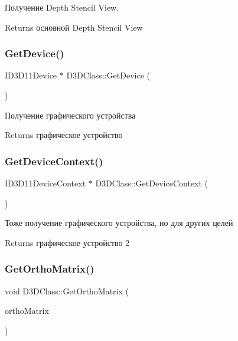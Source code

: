 Получение Depth Stencil View. 

\begin{DoxyReturn}{Returns}
основной Depth Stencil View 
\end{DoxyReturn}
\mbox{\label{class_d3_d_class_a20963c561731ea05018ec626d1fba80c}} 
\subsubsection{\texorpdfstring{Get\+Device()}{GetDevice()}}
{\footnotesize\ttfamily I\+D3\+D11\+Device $\ast$ D3\+D\+Class\+::\+Get\+Device (\begin{DoxyParamCaption}{ }\end{DoxyParamCaption})}



Получение графического устройства 

\begin{DoxyReturn}{Returns}
графическое устройство 
\end{DoxyReturn}
\mbox{\label{class_d3_d_class_a1d0ac6cc358094b68afa7637c95ec47e}} 
\subsubsection{\texorpdfstring{Get\+Device\+Context()}{GetDeviceContext()}}
{\footnotesize\ttfamily I\+D3\+D11\+Device\+Context $\ast$ D3\+D\+Class\+::\+Get\+Device\+Context (\begin{DoxyParamCaption}{ }\end{DoxyParamCaption})}



Тоже получение графического устройства, но для других целей 

\begin{DoxyReturn}{Returns}
графическое устройство 2 
\end{DoxyReturn}
\mbox{\label{class_d3_d_class_a7227e509b814c581f9e9360c408f64d3}} 
\subsubsection{\texorpdfstring{Get\+Ortho\+Matrix()}{GetOrthoMatrix()}}
{\footnotesize\ttfamily void D3\+D\+Class\+::\+Get\+Ortho\+Matrix (\begin{DoxyParamCaption}\item[{D3\+D\+X\+M\+A\+T\+R\+IX \&}]{ortho\+Matrix }\end{DoxyParamCaption})}



